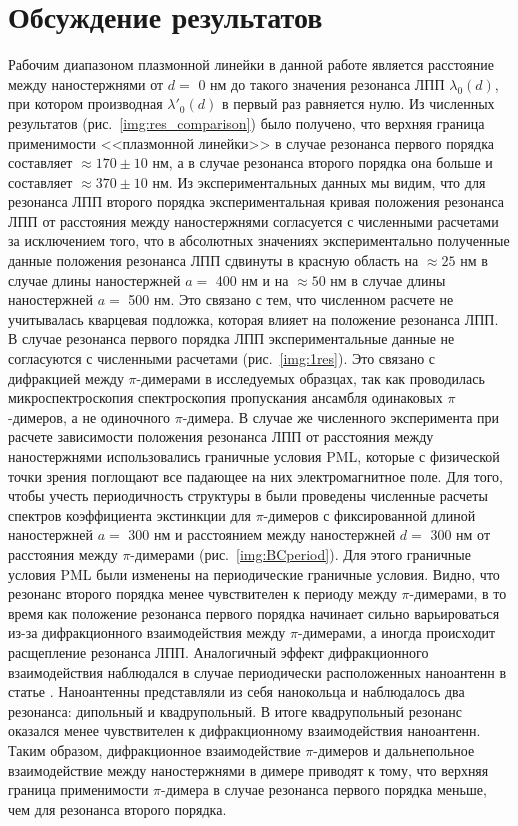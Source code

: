 \section{Обсуждение результатов}

Рабочим диапазоном плазмонной линейки в данной работе является расстояние между наностержнями от $ d = $ 0 нм до такого значения резонанса ЛПП $ \lambda_0 (d)$, при котором производная $ \lambda'_0 (d) $  в первый раз равняется нулю. Из численных результатов (рис.~\ref{img:res_comparison}) было получено, что верхняя граница применимости <<плазмонной линейки>> в случае резонанса первого порядка составляет $ \approx 170 \pm 10 $ нм, а в случае резонанса второго порядка она больше и составляет $ \approx 370 \pm 10 $ нм. Из экспериментальных данных мы видим, что для резонанса ЛПП второго порядка экспериментальная кривая положения резонанса ЛПП от расстояния между наностержнями согласуется с численными расчетами за исключением того, что в абсолютных значениях экспериментально полученные данные положения резонанса ЛПП сдвинуты в красную область на  $ \approx 25 $ нм в случае длины наностержней $ a = $ 400 нм и на $ \approx 50 $ нм в случае длины наностержней $ a = $ 500 нм. Это связано с тем, что численном расчете не учитывалась кварцевая подложка, которая влияет на положение резонанса ЛПП. В случае резонанса первого порядка ЛПП экспериментальные данные не согласуются с численными расчетами (рис.~\ref{img:1res}). Это связано с дифракцией между $ \pi $-димерами в исследуемых образцах, так как проводилась микроспектроскопия спектроскопия пропускания ансамбля одинаковых $ \pi $-димеров, а не одиночного $ \pi $-димера. В случае же численного эксперимента при расчете зависимости положения резонанса ЛПП от расстояния между наностержнями использовались граничные условия PML, которые с физической точки зрения поглощают все падающее на них электромагнитное поле. Для того, чтобы учесть периодичность структуры в были проведены численные расчеты спектров коэффициента экстинкции для $ \pi $-димеров с фиксированной длиной наностержней $ a = $ 300 нм и расстоянием между наностержней $ d = $ 300 нм от расстояния между $ \pi $-димерами (рис.~\ref{img:BCperiod}). Для этого граничные условия PML были изменены на периодические граничные условия. Видно, что резонанс второго порядка менее чувствителен к периоду между $ \pi $-димерами, в то время как положение резонанса первого порядка начинает сильно варьироваться из-за дифракционного взаимодействия между $ \pi $-димерами, а иногда происходит расщепление резонанса ЛПП. Аналогичный эффект дифракционного взаимодействия наблюдался в случае периодически расположенных наноантенн в статье \cite{diffractionCoupling}. Наноантенны представляли из себя нанокольца и наблюдалось два резонанса: дипольный и квадрупольный. В итоге квадрупольный резонанс оказался менее чувствителен к дифракционному взаимодействия наноантенн.
Таким образом, дифракционное взаимодействие $ \pi $-димеров и дальнепольное взаимодействие между наностержнями в димере приводят к тому, что верхняя граница применимости $ \pi $-димера в случае резонанса первого порядка меньше, чем для резонанса второго порядка. 